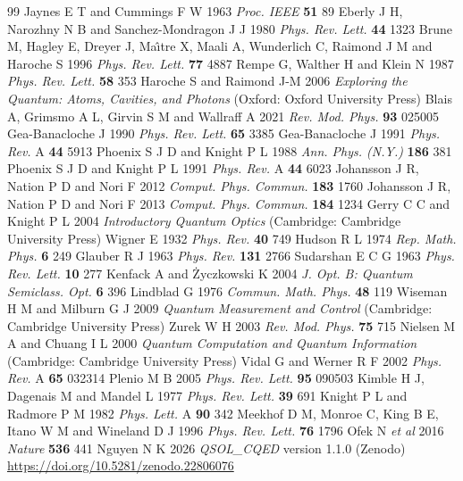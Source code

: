 \documentclass{iopjournal}
\begin{document}
\begin{thebibliography}{99}
 Jaynes E T and Cummings F W 1963 {\it Proc. IEEE} {\bf 51} 89
 Eberly J H, Narozhny N B and Sanchez-Mondragon J J 1980 {\it Phys. Rev. Lett.} {\bf 44} 1323
 Brune M, Hagley E, Dreyer J, Ma\^{\i}tre X, Maali A, Wunderlich C, Raimond J M and Haroche S 1996 {\it Phys. Rev. Lett.} {\bf 77} 4887
 Rempe G, Walther H and Klein N 1987 {\it Phys. Rev. Lett.} {\bf 58} 353
 Haroche S and Raimond J-M 2006 {\it Exploring the Quantum: Atoms, Cavities, and Photons} (Oxford: Oxford University Press)
 Blais A, Grimsmo A L, Girvin S M and Wallraff A 2021 {\it Rev. Mod. Phys.} {\bf 93} 025005
 Gea-Banacloche J 1990 {\it Phys. Rev. Lett.} {\bf 65} 3385
 Gea-Banacloche J 1991 {\it Phys. Rev.} A {\bf 44} 5913
 Phoenix S J D and Knight P L 1988 {\it Ann. Phys. (N.Y.)} {\bf 186} 381
 Phoenix S J D and Knight P L 1991 {\it Phys. Rev.} A {\bf 44} 6023
 Johansson J R, Nation P D and Nori F 2012 {\it Comput. Phys. Commun.} {\bf 183} 1760
 Johansson J R, Nation P D and Nori F 2013 {\it Comput. Phys. Commun.} {\bf 184} 1234
 Gerry C C and Knight P L 2004 {\it Introductory Quantum Optics} (Cambridge: Cambridge University Press)
 Wigner E 1932 {\it Phys. Rev.} {\bf 40} 749
 Hudson R L 1974 {\it Rep. Math. Phys.} {\bf 6} 249
 Glauber R J 1963 {\it Phys. Rev.} {\bf 131} 2766
 Sudarshan E C G 1963 {\it Phys. Rev. Lett.} {\bf 10} 277
 Kenfack A and \.{Z}yczkowski K 2004 {\it J. Opt. B: Quantum Semiclass. Opt.} {\bf 6} 396
 Lindblad G 1976 {\it Commun. Math. Phys.} {\bf 48} 119
 Wiseman H M and Milburn G J 2009 {\it Quantum Measurement and Control} (Cambridge: Cambridge University Press)
 Zurek W H 2003 {\it Rev. Mod. Phys.} {\bf 75} 715
 Nielsen M A and Chuang I L 2000 {\it Quantum Computation and Quantum Information} (Cambridge: Cambridge University Press)
 Vidal G and Werner R F 2002 {\it Phys. Rev.} A {\bf 65} 032314
 Plenio M B 2005 {\it Phys. Rev. Lett.} {\bf 95} 090503
 Kimble H J, Dagenais M and Mandel L 1977 {\it Phys. Rev. Lett.} {\bf 39} 691
 Knight P L and Radmore P M 1982 {\it Phys. Lett.} A {\bf 90} 342
 Meekhof D M, Monroe C, King B E, Itano W M and Wineland D J 1996 {\it Phys. Rev. Lett.} {\bf 76} 1796
 Ofek N {\it et al} 2016 {\it Nature} {\bf 536} 441
 Nguyen N K 2026 {\it QSOL\_CQED} version 1.1.0 (Zenodo) \url{https://doi.org/10.5281/zenodo.22806076}
\end{thebibliography}
\end{document}
